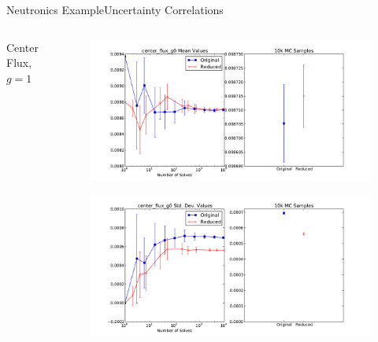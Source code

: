 \documentclass{beamer}
\begin{document}
\begin{frame}{Neutronics Example}{Uncertainty Correlations}\vspace{-20pt}
  \begin{columns}
    \begin{column}{0.3\textwidth}
      \centering
      \vfill
      Center Flux, $g=1$
      \vfill
    \end{column}
    \begin{column}{0.7\textwidth}
      \begin{figure}
        \centering
        \includegraphics[width=\linewidth]{c5g7/C5G7_center_flux_g0_mean_reduction}
      \end{figure}
      \vspace{-30pt}
      \begin{figure}
        \centering
        \includegraphics[width=\linewidth]{c5g7/C5G7_center_flux_g0_stddev_reduction}
      \end{figure}
    \end{column}
  \end{columns}
\end{frame}
\end{document}
